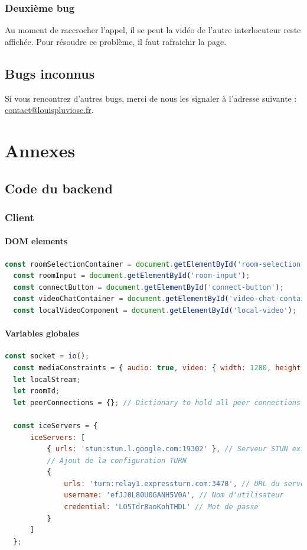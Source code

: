 \documentclass[12pt, a4paper, oneside]{thesis}
\newcommand{\subsubsubsection}[1]{\paragraph{#1}\mbox{}\par}
\begin{document}
\subsubsection{Deuxième bug}

Au moment de raccrocher l'appel, il se peut la vidéo de l'autre interlocuteur reste affichée. Pour résoudre ce problème, il faut rafraichir la page.\\

\subsection{Bugs inconnus}

Si vous rencontrez d'autres bugs, merci de nous les signaler à l'adresse suivante : \href{mailto:contact@louispluviose.fr}{contact@louispluviose.fr}.\\

\newpage

\section{Annexes}

\subsection{Code du backend}

\subsubsection{Client}

\subsubsubsection{DOM elements}

\begin{lstlisting}[language=JavaScript, caption={DOM Elements}, label=DOM Elements]
  const roomSelectionContainer = document.getElementById('room-selection-container');
  const roomInput = document.getElementById('room-input');
  const connectButton = document.getElementById('connect-button');
  const videoChatContainer = document.getElementById('video-chat-container');
  const localVideoComponent = document.getElementById('local-video');
\end{lstlisting}

\subsubsubsection{Variables globales}

\begin{lstlisting}[language=JavaScript, caption={Variables}, label=Variables]
  const socket = io();
  const mediaConstraints = { audio: true, video: { width: 1280, height: 720 } };
  let localStream;
  let roomId;
  let peerConnections = {}; // Dictionary to hold all peer connections
  
  const iceServers = {
      iceServers: [
          { urls: 'stun:stun.l.google.com:19302' }, // Serveur STUN existant
          // Ajout de la configuration TURN
          {
              urls: 'turn:relay1.expressturn.com:3478', // URL du serveur TURN
              username: 'efJJ0L80U0GANH5V0A', // Nom d'utilisateur
              credential: 'LO5Tdr8aoKohTHDL' // Mot de passe
          }
      ]
  };
\end{lstlisting}
\end{document}
